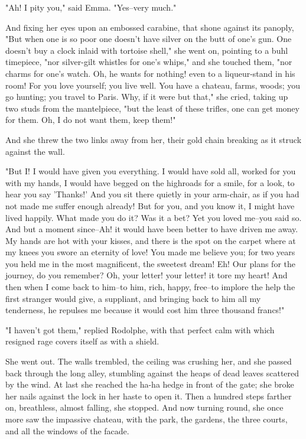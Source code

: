\documentclass{tufte-book}
\begin{document}
"Ah! I pity you," said Emma. "Yes--very much."

And fixing her eyes upon an embossed carabine, that shone against its
panoply, "But when one is so poor one doesn't have silver on the butt of
one's gun. One doesn't buy a clock inlaid with tortoise shell," she went
on, pointing to a buhl timepiece, "nor silver-gilt whistles for one's
whips," and she touched them, "nor charms for one's watch. Oh, he wants
for nothing! even to a liqueur-stand in his room! For you love yourself;
you live well. You have a chateau, farms, woods; you go hunting; you
travel to Paris. Why, if it were but that," she cried, taking up two
studs from the mantelpiece, "but the least of these trifles, one can get
money for them. Oh, I do not want them, keep them!"

And she threw the two links away from her, their gold chain breaking as
it struck against the wall.

"But I! I would have given you everything. I would have sold all, worked
for you with my hands, I would have begged on the highroads for a smile,
for a look, to hear you say 'Thanks!' And you sit there quietly in your
arm-chair, as if you had not made me suffer enough already! But for you,
and you know it, I might have lived happily. What made you do it? Was
it a bet? Yet you loved me--you said so. And but a moment since--Ah!
it would have been better to have driven me away. My hands are hot with
your kisses, and there is the spot on the carpet where at my knees you
swore an eternity of love! You made me believe you; for two years you
held me in the most magnificent, the sweetest dream! Eh! Our plans for
the journey, do you remember? Oh, your letter! your letter! it tore my
heart! And then when I come back to him--to him, rich, happy, free--to
implore the help the first stranger would give, a suppliant, and
bringing back to him all my tenderness, he repulses me because it would
cost him three thousand francs!"

"I haven't got them," replied Rodolphe, with that perfect calm with
which resigned rage covers itself as with a shield.

She went out. The walls trembled, the ceiling was crushing her, and she
passed back through the long alley, stumbling against the heaps of dead
leaves scattered by the wind. At last she reached the ha-ha hedge in
front of the gate; she broke her nails against the lock in her haste to
open it. Then a hundred steps farther on, breathless, almost falling,
she stopped. And now turning round, she once more saw the impassive
chateau, with the park, the gardens, the three courts, and all the
windows of the facade.
\end{document}
